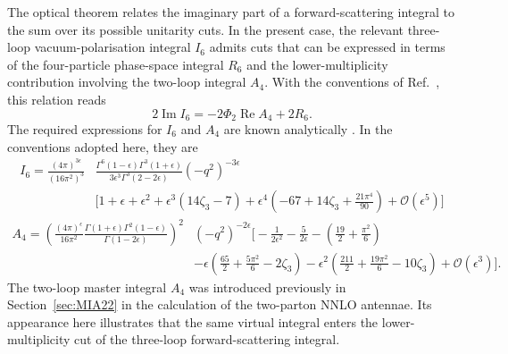 The optical theorem relates the imaginary part of a forward-scattering integral to the sum over
its possible unitarity cuts. In the present case, the relevant three-loop vacuum-polarisation
integral $I_6$ admits cuts that can be expressed in terms of the four-particle phase-space
integral $R_6$ and the lower-multiplicity contribution involving the two-loop integral $A_4$.
With the conventions of Ref.~\cite{GehrmannDeRidder0311276}, this relation reads
\begin{equation}
    2\operatorname{Im}I_6 = -2\Phi_2\operatorname{Re}A_4 + 2R_6.
\end{equation}
The required expressions for $I_6$ and $A_4$ are known analytically
\cite{GehrmannDeRidder0311276}. In the conventions adopted here, they are
\begin{equation}
    \begin{split}
        I_6 = \frac{(4\pi)^{3\epsilon}}{\left(16\pi^2\right)^3}&\frac{\Gamma^6(1-\epsilon)\Gamma^3(1+\epsilon)}{3\epsilon^3\Gamma^3(2-2\epsilon)}\!\left(-q^2\right)^{-3\epsilon}\\
                                                                      &\Bigg[1+\epsilon+\epsilon^2+\epsilon^3(14\zeta_3-7)+\epsilon^4\left(-67+14\zeta_3+\frac{21\pi^4}{90}\right)+\mathcal O\!\left(\epsilon^5\right)\Bigg]
    \end{split}
\end{equation}
\begin{equation}
    \begin{split}
        A_4 = \left(\frac{(4\pi)^\epsilon}{16\pi^2}\frac{\Gamma(1+\epsilon)\Gamma^2(1-\epsilon)}{\Gamma(1-2\epsilon)}\right)^2&\!\left(-q^2\right)^{-2\epsilon}\Bigg[-\frac1{2\epsilon^2}-\frac5{2\epsilon}-\left(\frac{19}2+\frac{\pi^2}6\right)\\
                                                                                                                              &-\epsilon\left(\frac{65}2+\frac{5\pi^2}6-2\zeta_3\right)-\epsilon^2\left(\frac{211}2+\frac{19\pi^2}6-10\zeta_3\right)+\mathcal O\!\left(\epsilon^3\right)\Bigg].
    \end{split}
\end{equation}
The two-loop master integral $A_4$ was introduced previously in Section~\ref{sec:MIA22}
in the calculation of the two-parton NNLO antennae. Its appearance here illustrates that the
same virtual integral enters the lower-multiplicity cut of the three-loop forward-scattering
integral.

